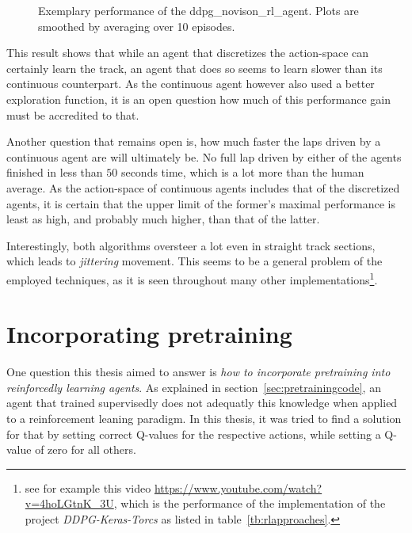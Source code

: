 \begin{figure}[h!]
	{%
		\setlength{\fboxsep}{0pt}%
		\setlength{\fboxrule}{1pt}%
	}%
	\centering
	\caption[Exemplary performance of the ddpg\_novison\_rl\_agent]{Exemplary performance of the ddpg\_novison\_rl\_agent. Plots are smoothed by averaging over 10 episodes.}
	\label{fig:ddpg_result}
\end{figure}


This result shows that while an agent that discretizes the action-space can certainly learn the track, an agent that does so seems to learn slower than its continuous counterpart. As the continuous agent however also used a better exploration function, it is an open question how much of this performance gain must be accredited to that. 

Another question that remains open is, how much faster the laps driven by a continuous agent are will ultimately be. No full lap driven by either of the agents finished in less than $50$ seconds time, which is a lot more than the human average. As the action-space of continuous agents includes that of the discretized agents, it is certain that the upper limit of the former's maximal performance is least as high, and probably much higher, than that of the latter.

Interestingly, both algorithms oversteer a lot even in straight track sections, which leads to \textit{jittering} movement. This seems to be a general problem of the employed techniques, as it is seen throughout many other implementations\footnote{see for example this video \url{https://www.youtube.com/watch?v=4hoLGtnK_3U}, which is the performance of the implementation of the project \textit{DDPG-Keras-Torcs} as listed in table~\ref{tb:rlapproaches}.}.


\section{Incorporating pretraining}
\label{sec:incorporatePre}

One question this thesis aimed to answer is \textit{how to incorporate pretraining into reinforcedly learning agents}. As explained in section~\ref{sec:pretrainingcode}, an agent that trained supervisedly does not adequatly  this knowledge when applied to a reinforcement leaning paradigm. In this thesis, it was tried to find a solution for that by setting correct Q-values for the respective actions, while setting a Q-value of zero for all others.

